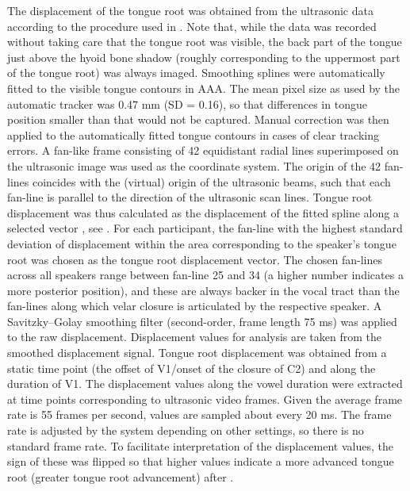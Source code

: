 \documentclass[preprint]{JASAnew}
\begin{document}
The displacement of the tongue root was obtained from the ultrasonic
data according to the procedure used in \citet{kirkham2017}. Note that,
while the data was recorded without taking care that the tongue root was
visible, the back part of the tongue just above the hyoid bone shadow
(roughly corresponding to the uppermost part of the tongue root) was
always imaged. Smoothing splines were automatically fitted to the
visible tongue contours in AAA. The mean pixel size as used by the
automatic tracker was 0.47 mm (SD = 0.16), so that differences in tongue
position smaller than that would not be captured. Manual correction was
then applied to the automatically fitted tongue contours in cases of
clear tracking errors. A fan-like frame consisting of 42 equidistant
radial lines superimposed on the ultrasonic image was used as the
coordinate system. The origin of the 42 fan-lines coincides with the
(virtual) origin of the ultrasonic beams, such that each fan-line is
parallel to the direction of the ultrasonic scan lines. Tongue root
displacement was thus calculated as the displacement of the fitted
spline along a selected vector \citep{strycharczuk2015}, see
. For each participant, the fan-line with the highest
standard deviation of displacement within the area corresponding to the
speaker's tongue root was chosen as the tongue root displacement vector.
The chosen fan-lines across all speakers range between fan-line 25 and
34 (a higher number indicates a more posterior position), and these are
always backer in the vocal tract than the fan-lines along which velar
closure is articulated by the respective speaker. A Savitzky--Golay
smoothing filter (second-order, frame length 75 ms) was applied to the
raw displacement. Displacement values for analysis are taken from the
smoothed displacement signal. Tongue root displacement was obtained from
a static time point (the offset of V1/onset of the closure of C2) and
along the duration of V1. The displacement values along the vowel
duration were extracted at time points corresponding to ultrasonic video
frames. Given the average frame rate is 55 frames per second, values are
sampled about every 20 ms. The frame rate is adjusted by the system
depending on other settings, so there is no standard frame rate. To
facilitate interpretation of the displacement values, the sign of these
was flipped so that higher values indicate a more advanced tongue root
(greater tongue root advancement) after \citet{kirkham2017}.
\end{document}
